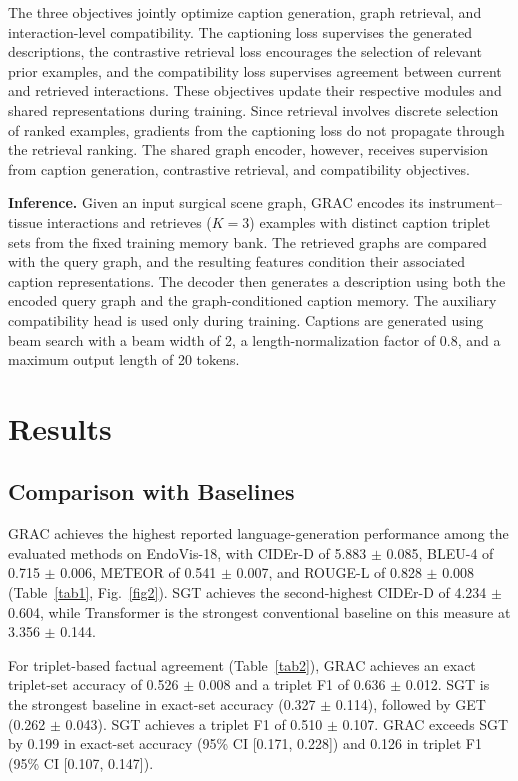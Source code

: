 \documentclass[11pt]{article}
\begin{document}
The three objectives jointly optimize caption generation, graph retrieval, and interaction-level compatibility. The captioning loss supervises the generated descriptions, the contrastive retrieval loss encourages the selection of relevant prior examples, and the compatibility loss supervises agreement between current and retrieved interactions. These objectives update their respective modules and shared representations during training. Since retrieval involves discrete selection of ranked examples, gradients from the captioning loss do not propagate through the retrieval ranking. The shared graph encoder, however, receives supervision from caption generation, contrastive retrieval, and compatibility objectives.

\textbf{Inference.} Given an input surgical scene graph, GRAC encodes its instrument--tissue interactions and retrieves ($K=3$) examples with distinct caption triplet sets from the fixed training memory bank. The retrieved graphs are compared with the query graph, and the resulting features condition their associated caption representations. The decoder then generates a description using both the encoded query graph and the graph-conditioned caption memory. The auxiliary compatibility head is used only during training. Captions are generated using beam search with a beam width of 2, a length-normalization factor of 0.8, and a maximum output length of 20 tokens.


\section{Results}\label{sec5}

\subsection{Comparison with Baselines}\label{subsec5.1}

GRAC achieves the highest reported language-generation performance among the evaluated methods on EndoVis-18, with CIDEr-D of 5.883 $\pm$ 0.085, BLEU-4 of 0.715 $\pm$ 0.006, METEOR of 0.541 $\pm$ 0.007, and ROUGE-L of 0.828 $\pm$ 0.008 (Table~\ref{tab1}, Fig.~\ref{fig2}). SGT achieves the second-highest CIDEr-D of 4.234 $\pm$ 0.604, while Transformer is the strongest conventional baseline on this measure at 3.356 $\pm$ 0.144.

For triplet-based factual agreement (Table~\ref{tab2}), GRAC achieves an exact triplet-set accuracy of 0.526 $\pm$ 0.008 and a triplet F1 of 0.636 $\pm$ 0.012. SGT is the strongest baseline in exact-set accuracy (0.327 $\pm$ 0.114), followed by GET (0.262 $\pm$ 0.043). SGT achieves a triplet F1 of 0.510 $\pm$ 0.107. GRAC exceeds SGT by 0.199 in exact-set accuracy (95\% CI [0.171, 0.228]) and 0.126 in triplet F1 (95\% CI [0.107, 0.147]).
\end{document}
